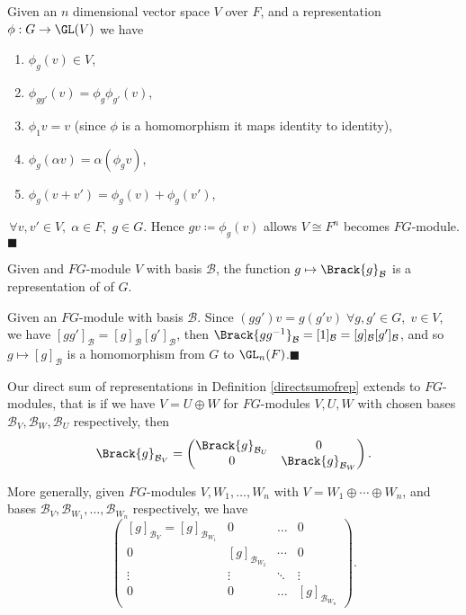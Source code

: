 \documentclass[../Project.tex]{subfiles}
\begin{document}
\begin{proo*}[\cite{2}]
	Given an $n$ dimensional vector space $V$ over $F$, and a representation $\phi : G \to \GL(V)$ we have
	\begin{enumerate}
		\item $\phi_g(v) \in V$,
		\item $\phi_{gg'}(v) = \phi_g\phi_{g'}(v)$,
		\item $\phi_1{v} = v$ (since $\phi$ is a homomorphism it maps identity to identity),
		\item $\phi_g(\alpha v) = \alpha(\phi_g v)$,
		\item $\phi_g(v + v') = \phi_g(v) + \phi_g(v')$,
	\end{enumerate}
	$\,\forall v,v' \in V,\; \alpha \in F,\; g \in G$. Hence $gv \coloneqq \phi_g(v)$ allows $V \cong F^n$ becomes $FG$-module. $\blacksquare$
\end{proo*}



\begin{theo}[\cite{2}]
	Given and $FG$-module $V$ with basis $\mathcal{B}$, the function $g \mapsto \Brack{g}_\mathcal{B}$ is a representation of of $G$.
\end{theo}
\begin{proo*}[\cite{2}]
	Given an $FG$-module with basis $\mathcal{B}$. Since $(gg')v = g(g'v)\;\forall g,g' \in G,\;v \in V$, we have $[gg']_\mathcal{B} = [g]_\mathcal{B}[g']_\mathcal{B}$, then $\Brack{gg^{-1}}_\mathcal{B} = [1]_\mathcal{B} = [g]_\mathcal{B}[g']_\mathcal{B}$, and so $g \mapsto [g]_\mathcal{B}$ is a homomorphism from $G$ to $\GL_n(F)$.\;$\blacksquare$
\end{proo*}

\begin{defi}
	\label{directsumoffg}
	Our direct sum of representations in Definition \ref{directsumofrep} extends to $FG$-modules, that is if we have $V = U \oplus W$ for $FG$-modules $V,U,W$ with chosen bases $\mathcal{B}_V,\mathcal{B}_W,\mathcal{B}_U$ respectively, then
	$$\Brack{g}_{\mathcal{B}_V} = \begin{pmatrix}\Brack{g}_{\mathcal{B}_U} & 0 \\ 0 & \Brack{g}_{\mathcal{B}_W}\end{pmatrix}.$$

More generally, given $FG$-modules $V,W_1,\dots,W_n$ with $V = W_1 \oplus \cdots \oplus W_n$, and bases $\mathcal{B}_V,{\mathcal{B}_{W_1}},\dots,{\mathcal{B}_{W_n}}$ respectively, we have
$$\begin{pmatrix} 
		[g]_{\mathcal{B}_V} = 
	    [g]_{\mathcal{B}_{W_1}}& 0 & \dots & 0 \\
	    0 & [g]_{\mathcal{B}_{W_2}} & \cdots & 0 \\
	    \vdots & \vdots& \ddots & \vdots\\
	    0 & 0  &\dots & [g]_{\mathcal{B}_{W_n}}
\end{pmatrix}.$$
\end{defi}
\end{document}
